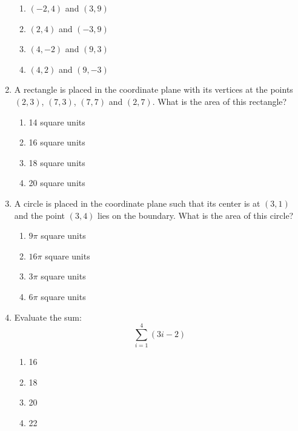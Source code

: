\documentclass{article}
\begin{document}
\begin{enumerate}
  \begin{enumerate} %
  
  \item $(-2,4)$ and $(3,9)$ %
  \item $(2,4)$ and $(-3,9)$
  \item $(4,-2)$ and $(9,3)$
  \item $(4,2)$ and $(9,-3)$
  \end{enumerate}


\item A rectangle is placed in the coordinate plane with its vertices at the points $(2,3)$, $(7,3)$, $(7,7)$ and $(2,7)$. What is the area of this rectangle?

  \begin{enumerate} %
  
  \item 14 square units
  \item 16 square units
  \item 18 square units
  \item 20 square units %
  \end{enumerate}



\item A circle is placed in the coordinate plane such that its center is at $(3,1)$ and the point $(3,4)$ lies on the boundary. What is the area of this circle?

    \begin{enumerate} %
  \item $9\pi$ square units %
  \item $16\pi$ square units %
  \item $3\pi$ square units %
  \item $6\pi$ square units %
  \end{enumerate}

\pagebreak

\item Evaluate the sum:
  \[\sum_{i=1}^{4} (3i-2)  \]
  
    \begin{enumerate} %
  \item 16
  \item 18
  \item 20
  \item 22 %
 

\end{enumerate}
\end{enumerate}
\end{document}
